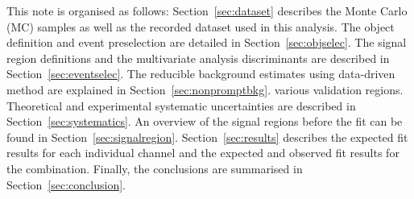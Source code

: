 This note is organised as follows: Section~\ref{sec:dataset} describes the Monte Carlo (MC) samples as well as the 
recorded dataset used in this analysis. The object definition and event preselection are detailed in Section~\ref{sec:objselec}. 
The signal region definitions and the multivariate analysis discriminants are described in Section~\ref{sec:eventselec}. 
The reducible background estimates using data-driven method are explained in Section~\ref{sec:nonpromptbkg}. 
various validation regions.  
Theoretical and experimental systematic uncertainties are described in Section~\ref{sec:systematics}. 
An overview of the signal regions before the fit can be found in Section~\ref{sec:signalregion}.
Section~\ref{sec:results} describes the expected fit results for each individual channel and the 
expected and observed fit results for the combination. 
Finally, the conclusions are summarised in Section~\ref{sec:conclusion}.



